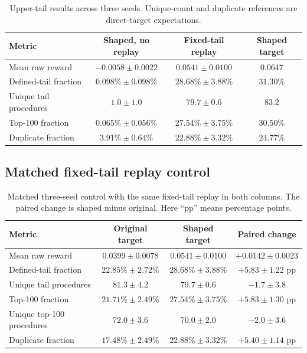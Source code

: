 \documentclass{article}
\begin{document}
\begin{table}[H]
\centering
\small
\begin{tabular}{l c c c}
\hline
Metric & Shaped, no replay & Fixed-tail replay & Shaped target \\
\hline
Mean raw reward & $-0.0058\pm0.0022$ & $0.0541\pm0.0100$ & $0.0647$ \\
Defined-tail fraction & $0.098\%\pm0.098\%$ & $28.68\%\pm3.88\%$ & $31.30\%$ \\
Unique tail procedures & $1.0\pm1.0$ & $79.7\pm0.6$ & $83.2$ \\
Top-100 fraction & $0.065\%\pm0.056\%$ & $27.54\%\pm3.75\%$ & $30.50\%$ \\
Duplicate fraction & $3.91\%\pm0.64\%$ & $22.88\%\pm3.32\%$ & $24.77\%$ \\
\hline
\end{tabular}
\caption{Upper-tail results across three seeds. Unique-count and duplicate references are direct-target expectations.}
\end{table}

\subsection{Matched fixed-tail replay control}

\begin{table}[H]
\centering
\small
\begin{tabular}{l c c c}
\hline
Metric & Original target & Shaped target & Paired change \\
\hline
Mean raw reward & $0.0399\pm0.0078$ & $0.0541\pm0.0100$ & $+0.0142\pm0.0023$ \\
Defined-tail fraction & $22.85\%\pm2.72\%$ & $28.68\%\pm3.88\%$ & $+5.83\pm1.22$ pp \\
Unique tail procedures & $81.3\pm4.2$ & $79.7\pm0.6$ & $-1.7\pm3.8$ \\
Top-100 fraction & $21.71\%\pm2.49\%$ & $27.54\%\pm3.75\%$ & $+5.83\pm1.30$ pp \\
Unique top-100 procedures & $72.0\pm3.6$ & $70.0\pm2.0$ & $-2.0\pm3.6$ \\
Duplicate fraction & $17.48\%\pm2.49\%$ & $22.88\%\pm3.32\%$ & $+5.40\pm1.14$ pp \\
\hline
\end{tabular}
\caption{Matched three-seed control with the same fixed-tail replay in both columns. The paired change is shaped minus original. Here ``pp'' means percentage points.}
\end{table}
\end{document}
